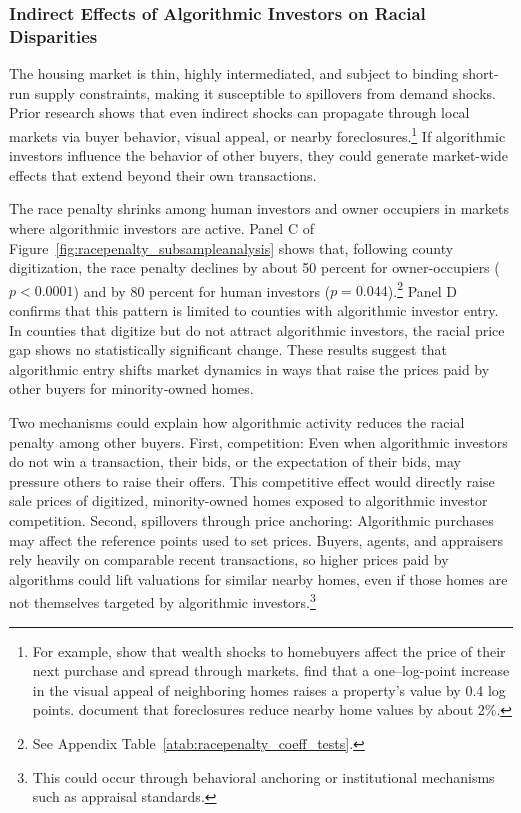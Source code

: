 \documentclass[11pt]{article}
\begin{document}
\subsubsection{Indirect Effects of Algorithmic Investors on Racial Disparities}
The housing market is thin, highly intermediated, and subject to binding short-run supply constraints, making it susceptible to spillovers from demand shocks. Prior research shows that even indirect shocks can propagate through local markets via buyer behavior, visual appeal, or nearby foreclosures.\footnote{For example, \citet{aiello_when_2022} show that wealth shocks to homebuyers affect the price of their next purchase and spread through markets. \citet{glaeser_computer_2018} find that a one–log-point increase in the visual appeal of neighboring homes raises a property’s value by 0.4 log points. \citet{cohen2016sales} document that foreclosures reduce nearby home values by about 2\%.} If algorithmic investors influence the behavior of other buyers, they could generate market-wide effects that extend beyond their own transactions.

The race penalty shrinks among human investors and owner occupiers in markets where algorithmic investors are active. Panel C of Figure~\ref{fig:racepenalty_subsampleanalysis} shows that, following county digitization, the race penalty declines by about 50 percent for owner-occupiers ($p < 0.0001$) and by 80 percent for human investors ($p = 0.044$).\footnote{See Appendix Table~\ref{atab:racepenalty_coeff_tests}.} Panel D confirms that this pattern is limited to counties with algorithmic investor entry. In counties that digitize but do not attract algorithmic investors, the racial price gap shows no statistically significant change. These results suggest that algorithmic entry shifts market dynamics in ways that raise the prices paid by other buyers for minority-owned homes.


Two mechanisms could explain how algorithmic activity reduces the racial penalty among other buyers. First, competition: Even when algorithmic investors do not win a transaction, their bids, or the expectation of their bids, may pressure others to raise their offers. This competitive effect would directly raise sale prices of digitized, minority-owned homes exposed to algorithmic investor competition. Second, spillovers through price anchoring: Algorithmic purchases may affect the reference points used to set prices. Buyers, agents, and appraisers rely heavily on comparable recent transactions, so higher prices paid by algorithms could lift valuations for similar nearby homes, even if those homes are not themselves targeted by algorithmic investors.\footnote{This could occur through behavioral anchoring or institutional mechanisms such as appraisal standards.}
\end{document}
